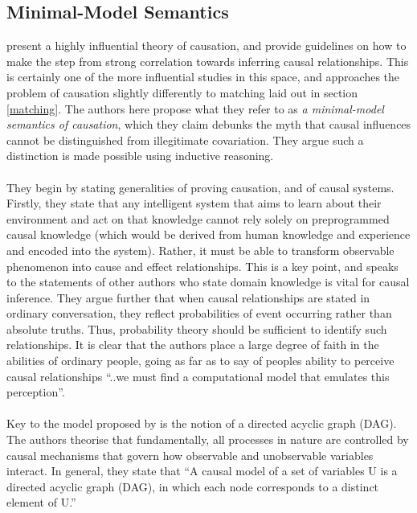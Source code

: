 {\subsection{Minimal-Model Semantics}
{\cite{pearl1995theory} present a highly influential theory of causation, and provide guidelines on how to make the step from strong correlation towards inferring causal relationships. This is certainly one of the more influential studies in this space, and approaches the problem of causation slightly differently to matching laid out in section \ref{matching}. The authors here propose what they refer to as {\it a minimal-model semantics of causation}, which they claim debunks the myth that causal influences cannot be distinguished from illegitimate covariation. They argue such a distinction is made possible using inductive reasoning.\\\\
They begin by stating generalities of proving causation, and of causal systems. Firstly, they state that any intelligent system that aims to learn about their environment and act on that knowledge cannot rely solely on preprogrammed causal knowledge (which would be derived from human knowledge and experience and encoded into the system). Rather, it must be able to transform observable phenomenon into cause and effect relationships. This is a key point, and speaks to the statements of other authors who state domain knowledge is vital for causal inference. They argue further that when causal relationships are stated in ordinary conversation, they reflect probabilities of event occurring rather than absolute truths. Thus, probability theory should be sufficient to identify such relationships. It is clear that the authors place a large degree of faith in the abilities of ordinary people, going as far as to say of peoples ability to perceive causal relationships ``..we must find a computational model that emulates this perception''}.\\\\
Key to the model proposed by \cite{pearl1995theory} is the notion of a directed acyclic graph (DAG). The authors theorise that fundamentally, all processes in nature are controlled by causal mechanisms that govern how observable and unobservable variables interact. In general, they state that
``A causal model of a set of variables U is a directed acyclic graph (DAG), in which each node corresponds to a distinct element of U.'' \cite {pearl1995theory} \\\\
}
